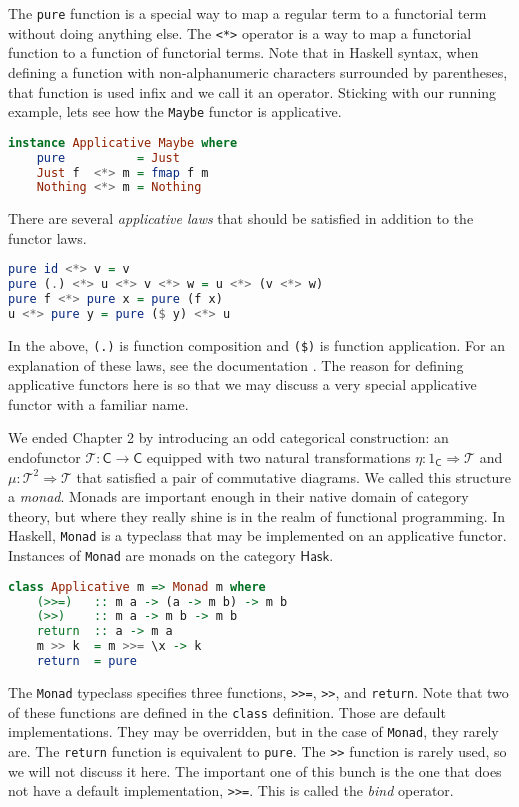 \documentclass[MS, xcolor=dvipsnames]{wfuthesis}
\def\sC{\mathsf{C}}
\def\cT{\mathcal{T}}
\def\Hask{\mathsf{Hask}}
\theoremstyle{definition}
\begin{document}
The \lstinline{pure} function is a special way to map a regular term to a functorial term without doing anything else. The \lstinline{<*>} operator is a way to map a functorial function to a function of functorial terms. Note that in Haskell syntax, when defining a function with non-alphanumeric characters surrounded by parentheses, that function is used infix and we call it an operator. Sticking with our running example, lets see how the \lstinline{Maybe} functor is applicative. 
\begin{lstlisting}[language=Haskell]
instance Applicative Maybe where
    pure          = Just
    Just f  <*> m = fmap f m
    Nothing <*> m = Nothing
\end{lstlisting}
There are several \emph{applicative laws} that should be satisfied in addition to the functor laws. 
\begin{lstlisting}[language=Haskell]
pure id <*> v = v
pure (.) <*> u <*> v <*> w = u <*> (v <*> w)
pure f <*> pure x = pure (f x)
u <*> pure y = pure ($ y) <*> u
\end{lstlisting}
In the above, \lstinline{(.)} is function composition and \lstinline{($)} is function application. For an explanation of these laws, see the documentation \cite{Prelude}. The reason for defining applicative functors here is so that we may discuss a very special applicative functor with a familiar name. \par 
We ended Chapter 2 by introducing an odd categorical construction: an endofunctor $\cT: \sC \to \sC$ equipped with two natural transformations $\eta: 1_\sC \Rightarrow \cT$ and $\mu: \cT^2 \Rightarrow \cT$ that satisfied a pair of commutative diagrams. We called this structure a \emph{monad}. Monads are important enough in their native domain of category theory, but where they really shine is in the realm of functional programming. In Haskell, \lstinline{Monad} is a typeclass that may be implemented on an applicative functor. Instances of \lstinline{Monad} are monads on the category $\Hask$. 
\begin{lstlisting}[language=Haskell]
class Applicative m => Monad m where
    (>>=)   :: m a -> (a -> m b) -> m b
    (>>)    :: m a -> m b -> m b
    return  :: a -> m a
    m >> k  = m >>= \x -> k
    return  = pure
\end{lstlisting}
The \lstinline{Monad} typeclass specifies three functions, \lstinline{>>=}, \lstinline{>>}, and \lstinline{return}. Note that two of these functions are defined in the \lstinline{class} definition. Those are default implementations. They may be overridden, but in the case of \lstinline{Monad}, they rarely are. The \lstinline{return} function is equivalent to \lstinline{pure}. The \lstinline{>>} function is rarely used, so we will not discuss it here. The important one of this bunch is the one that does not have a default implementation, \lstinline{>>=}. This is called the \emph{bind} operator. \par 
\end{document}
